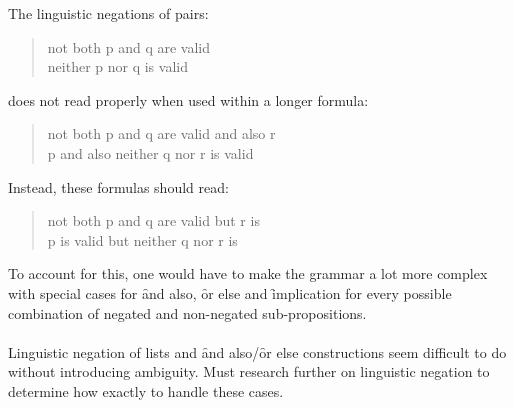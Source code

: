 \documentclass[a4paper]{article}
\begin{document}
The linguistic negations of pairs:
\begin{quote}
not both p and q are valid\\
neither p nor q is valid\\
\end{quote}
does not read properly when used within a longer formula:
\begin{quote}
    not both p and q are valid and also r\\
    p and also neither q nor r is valid\\
\end{quote}
Instead, these formulas should read:
\begin{quote}
    not both p and q are valid but r is\\
    p is valid but neither q nor r is
\end{quote}
To account for this, one would have to make the grammar a lot more complex
with special cases for \f{and also}, \f{or else} and \f{implication} for 
every possible combination of negated and non-negated sub-propositions.
\\~\\
Linguistic negation of lists and \f{and also}/\f{or else} constructions
seem difficult to do without introducing ambiguity.
Must research further on linguistic negation to determine how exactly to 
handle these cases.
\label{LastBody}
\end{document}
